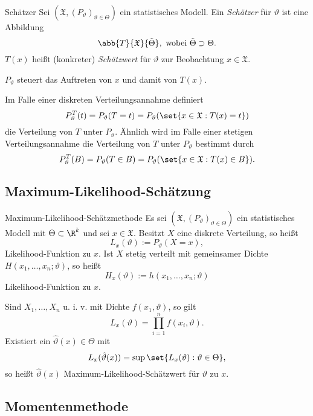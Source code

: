 \begin{karte}{Schätzer}
    Sei \((\mathfrak{X}, (P_\vartheta)_{\vartheta \in \Theta})\) ein statistisches Modell. 
    Ein \textit{Schätzer} für \(\vartheta\) ist eine Abbildung 
    \[ \abb{T}{\mathfrak{X}}{\tilde{\Theta}}, \text{ wobei } \tilde{\Theta} \supset \Theta. \]
    \(T(x)\) heißt (konkreter) \textit{Schätzwert} für \(\vartheta\) zur Beobachtung \(x\in \mathfrak{X}\). 

    \(P_\vartheta\) steuert das Auftreten von \(x\) und damit von \(T(x)\).

    Im Falle einer diskreten Verteilungsannahme definiert 
    \[ P_\vartheta^T(t) = P_\vartheta(T=t) = P_\vartheta(\set{x\in \mathfrak{X}: T(x) = t}) \]
    die Verteilung von \(T\) unter \(P_\vartheta\). Ähnlich wird im Falle einer stetigen Verteilungsannahme 
    die Verteilung von \(T\) unter \(P_\vartheta\) bestimmt durch 
    \[ P_\vartheta^T(B) = P_\vartheta(T\in B) = P_\vartheta(\set{x\in \mathfrak{X}: T(x) \in B}). \]
\end{karte}

\subsection{Maximum-Likelihood-Schätzung}

\begin{karte}{Maximum-Likelihood-Schätzmethode}
Es sei \((\mathfrak{X}, (P_\vartheta)_{\vartheta\in \Theta})\) ein statistisches Modell mit 
\(\Theta \subset \R^k\) und sei \(x\in \mathfrak{X}\).
Besitzt \(X\) eine diskrete Verteilung, so heißt 
\[ L_x(\vartheta) := P_\vartheta(X=x), \]
Likelihood-Funktion zu \(x\). 
Ist \(X\) stetig verteilt mit gemeinsamer Dichte \(H(x_1, \ldots, x_n; \vartheta)\), so heißt 
\[ H_x(\vartheta) := h(x_1, \ldots, x_n; \vartheta) \]
Likelihood-Funktion zu \(x\).

Sind \(X_1, \ldots, X_n\) u. i. v. mit Dichte \(f(x_1, \vartheta)\), so gilt 
\[ L_x(\vartheta) = \prod_{i=1}^n f(x_i, \vartheta). \]
Existiert ein \(\hat{\vartheta}(x) \in \Theta\) mit 
\[ L_x(\hat{\vartheta}(x)) = \sup \set{L_x(\vartheta) : \vartheta \in \Theta}, \]
so heißt \(\hat{\vartheta}(x)\) Maximum-Likelihood-Schätzwert für \(\vartheta\) zu \(x\).
\end{karte}

\subsection{Momentenmethode}

